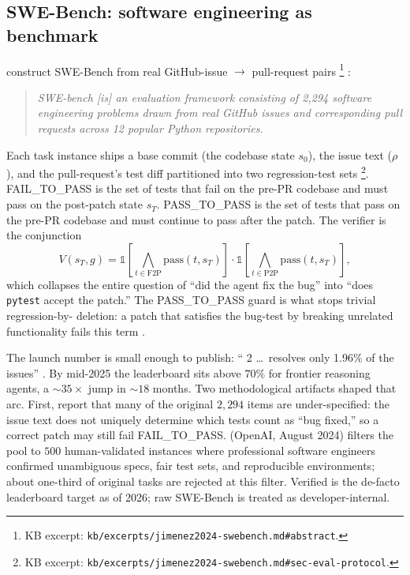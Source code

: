\subsection{SWE-Bench: software engineering as benchmark}
\label{sec:agentic-swebench}

\citet{jimenez2024-swebench} construct SWE-Bench from real
GitHub-issue $\to$ pull-request pairs%
\footnote{KB excerpt: \nolinkurl{kb/excerpts/jimenez2024-swebench.md#abstract}.}
\citep[\S{}abstract]{jimenez2024-swebench}:

\begin{quote}\itshape
SWE-bench [is] an evaluation framework consisting of 2,294 software
engineering problems drawn from real GitHub issues and corresponding
pull requests across 12 popular Python repositories.
\end{quote}

Each task instance ships a base commit (the codebase state $s_0$),
the issue text ($\rho$), and the pull-request's test diff partitioned
into two regression-test sets%
\footnote{KB excerpt: \nolinkurl{kb/excerpts/jimenez2024-swebench.md#sec-eval-protocol}.}.
\textsf{FAIL\_TO\_PASS} is the set of tests that fail on the pre-PR
codebase and must pass on the post-patch state $s_T$.
\textsf{PASS\_TO\_PASS} is the set of tests that pass on the pre-PR
codebase and must continue to pass after the patch. The verifier is
the conjunction
\[
V(s_T, g) = \mathbb{1}\!\left[\bigwedge_{t \in \mathrm{F2P}} \mathrm{pass}(t, s_T)\right] \cdot \mathbb{1}\!\left[\bigwedge_{t \in \mathrm{P2P}} \mathrm{pass}(t, s_T)\right],
\]
which collapses the entire question of ``did the agent fix the bug''
into ``does \texttt{pytest} accept the patch.'' The
\textsf{PASS\_TO\_PASS} guard is what stops trivial regression-by-
deletion: a patch that satisfies the bug-test by breaking unrelated
functionality fails this term \citep[\S{}sec-eval-protocol]{jimenez2024-swebench}.

The launch number is small enough to publish:
`` 2 \ldots\ resolves only 1.96\% of the issues''
\citep[\S{}sec-headline]{jimenez2024-swebench}. By mid-2025 the
 leaderboard sits above $70\%$ for frontier reasoning
agents, a $\sim 35\times$ jump in $\sim 18$ months. Two methodological
artifacts shaped that arc. First, \citet{jimenez2024-swebench} report
that many of the original $2{,}294$ items are under-specified: the
issue text does not uniquely determine which tests count as ``bug
fixed,'' so a correct patch may still fail \textsf{FAIL\_TO\_PASS}.
 (OpenAI, August 2024) filters the pool to $500$
human-validated instances where professional software engineers
confirmed unambiguous specs, fair test sets, and reproducible
environments; about one-third of original tasks are rejected at this
filter. Verified is the de-facto leaderboard target as of 2026;
raw SWE-Bench is treated as developer-internal.

